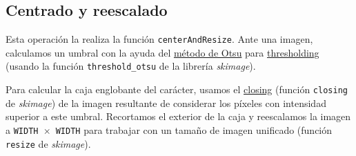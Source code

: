 \documentclass[a4]{article}
\begin{document}
\subsection{Centrado y reescalado}

Esta operación la realiza la función \texttt{centerAndResize}. Ante
una imagen, calculamos un umbral con la ayuda del \href{https://en.wikipedia.org/wiki/Otsu%27s_method}{método de Otsu}
  para
\href{https://en.wikipedia.org/wiki/Thresholding_(image_processing)}{thresholding} (usando la función \texttt{threshold\_otsu} de la librería \textit{skimage}). 

Para calcular la caja englobante del carácter, usamos el
\href{https://en.wikipedia.org/wiki/Closing_%28morphology%29}{closing}
  (función \texttt{closing} de \textit{skimage}) de la imagen
  resultante de considerar los píxeles con intensidad superior a este
  umbral. Recortamos el exterior de la caja y reescalamos la imagen a
  \texttt{WIDTH $\times$ WIDTH} para trabajar con un tamaño de imagen
  unificado (función \texttt{resize} de \textit{skimage}).
\end{document}
